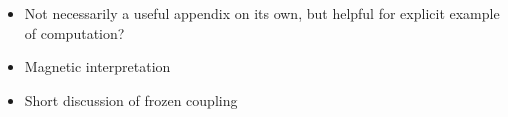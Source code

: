 \begin{subappendices}

\begin{itemize}
    \item
        Not necessarily a useful appendix on its own, but helpful for explicit example of computation?

    \item
        Magnetic interpretation

    \item
        Short discussion of frozen coupling
\end{itemize}
















\end{subappendices}
